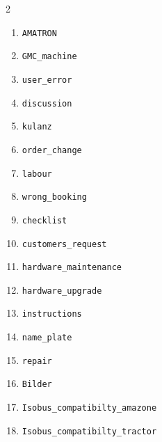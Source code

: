 \begin{multicols}{2}
\begin{enumerate}
    \item \texttt{AMATRON}
    \item \texttt{GMC\_\allowbreak machine}
    \item \texttt{user\_\allowbreak error}
    \item \texttt{discussion}
    \item \texttt{kulanz}
    \item \texttt{order\_\allowbreak change}
    \item \texttt{labour}
    \item \texttt{wrong\_\allowbreak booking}
    \item \texttt{checklist}
    \item \texttt{customers\_\allowbreak request}
    \item \texttt{hardware\_\allowbreak maintenance}
    \item \texttt{hardware\_\allowbreak upgrade}
    \item \texttt{instructions}
    \item \texttt{name\_\allowbreak plate}
    \item \texttt{repair}
    \item \texttt{Bilder}
    \item \texttt{Isobus\_\allowbreak compatibilty\_\allowbreak amazone}
    \item \texttt{Isobus\_\allowbreak compatibilty\_\allowbreak tractor}
\end{enumerate}
\end{multicols}